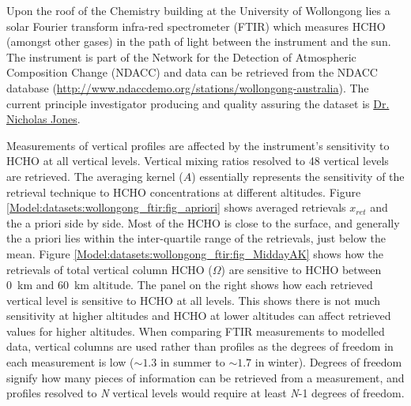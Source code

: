       Upon the roof of the Chemistry building at the University of Wollongong lies a solar Fourier transform infra-red spectrometer (FTIR) which measures HCHO (amongst other gases) in the path of light between the instrument and the sun.
      The instrument is part of the Network for the Detection of Atmospheric Composition Change (NDACC) and data can be retrieved from the NDACC database (\url{http://www.ndaccdemo.org/stations/wollongong-australia}).
      The current principle investigator producing and quality assuring the dataset is \href{mailto:njones@uow.edu.au}{Dr. Nicholas Jones}.
      
      Measurements of vertical profiles are affected by the instrument's sensitivity to HCHO at all vertical levels.
      Vertical mixing ratios resolved to 48 vertical levels are retrieved. %
      The averaging kernel ($A$) essentially represents the sensitivity of the retrieval technique to HCHO concentrations at different altitudes.
      Figure \ref{Model:datasets:wollongong_ftir:fig_apriori} shows averaged retrievals $x_{ret}$ and the a priori side by side.
      Most of the HCHO is close to the surface, and generally the a priori lies within the inter-quartile range of the retrievals, just below the mean.
      Figure \ref{Model:datasets:wollongong_ftir:fig_MiddayAK} shows how the retrievals of total vertical column HCHO ($\Omega$) are sensitive to HCHO between 0~km and 60~km altitude.
      The panel on the right shows how each retrieved vertical level is sensitive to HCHO at all levels.
      This shows there is not much sensitivity at higher altitudes and HCHO at lower altitudes can affect retrieved values for higher altitudes.
      When comparing FTIR measurements to modelled data, vertical columns are used rather than profiles as the degrees of freedom in each measurement is low ($\sim 1.3$ in summer to $\sim 1.7$ in winter).
      Degrees of freedom signify how many pieces of information can be retrieved from a measurement, and profiles resolved to \textit{N} vertical levels would require at least \textit{N}-1 degrees of freedom.
      
      
